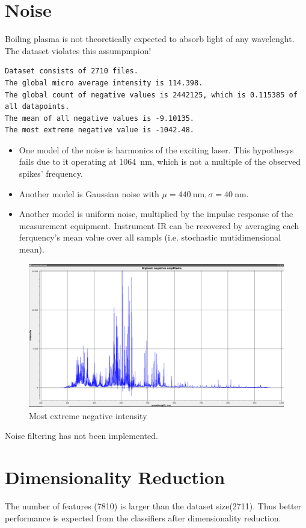 \documentclass{article}
\begin{document}
\section{Noise}
Boiling plasma is not theoretically expected to absorb light of any wavelenght.
The dataset violates this assumpmpion!
\par
\begin{verbatim}
Dataset consists of 2710 files.
The global micro average intensity is 114.398.
The global count of negative values is 2442125, which is 0.115385 of all datapoints.
The mean of all negative values is -9.10135.
The most extreme negative value is -1042.48.
\end{verbatim}
\begin{itemize}
\item{One model of the noise is harmonics of the exciting laser.
This hypothesys fails due to it operating at \SI{1064}{\nano\metre}, which is not a multiple of the observed spikes' frequency.}
\item{Another model is Gaussian noise with $\mu=\SI{440}{\nano\metre}, \sigma=\SI{40}{\nano\metre}$.}
\item{Another model is uniform noise, multiplied by the impulse response of the measurement equipment.
Instrument IR can be recovered by averaging each ferquency's mean value over all sampls (i.e. stochastic mutidimensional mean).}
\end{itemize}
\begin{figure}
\caption{Most extreme negative intensity}
\centering
\includegraphics[width=1.25\textwidth]{img/negatives}
\end{figure}
Noise filtering has not been implemented.


\section{Dimensionality Reduction}
The number of features (7810) is larger than the dataset size(2711).
Thus better performance is expected from the classifiers after dimensionality reduction.
\end{document}
